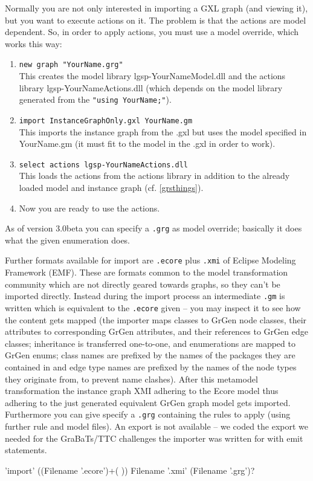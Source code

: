 \begin{note}\label{shellgxlimport}
Normally you are not only interested in importing a GXL graph (and viewing it), but you want to execute actions on it.
The problem is that the actions are model dependent.
So, in order to apply actions, you must use a model override, which works this way:
\begin{enumerate}
\item \texttt{new graph "YourName.grg"}\\
This creates the model library lgsp-YourNameModel.dll
and the actions library lgsp-YourNameActions.dll
(which depends on the model library generated from the \texttt{"using YourName;"}).
\item \texttt{import InstanceGraphOnly.gxl YourName.gm}\\
This imports the instance graph from the .gxl but uses the model specified
in YourName.gm (it must fit to the model in the .gxl in order to work).
\item \texttt{select actions lgsp-YourNameActions.dll}\\
This loads the actions from the actions library in addition to the already
loaded model and instance graph (cf. \ref{grsthings}).
\item Now you are ready to use the actions.
\end{enumerate}
As of version 3.0beta you can specify a \texttt{.grg} as model override;
basically it does what the given enumeration does.
\end{note}

\begin{note}\label{shellecoreexport}
Further formats available for import are \texttt{.ecore} plus \texttt{.xmi} of Eclipse Modeling Framework (EMF).
These are formats common to the model transformation community which are not directly geared towards graphs, so they can't be imported directly.
Instead during the import process an intermediate \texttt{.gm} is written which is equivalent to the \texttt{.ecore} given -- you may inspect it to see how the content gets mapped
(the importer maps classes to GrGen node classes, their attributes
to corresponding GrGen attributes, and their references to GrGen
edge classes; inheritance is transferred one-to-one, and enumerations are
mapped to GrGen enums;
class names are prefixed by the names of the packages they are contained in
and edge type names are prefixed by the names of the node types they originate from,
to prevent name clashes).
After this metamodel transformation the instance graph XMI adhering to the Ecore model thus adhering to the just
generated equivalent GrGen graph model gets imported.
Furthermore you can give specify a \texttt{.grg} containing the rules to apply (using further rule and model files).
An export is not available -- we coded the export we needed for the GraBaTs/TTC challenges the importer was written for with emit statements.
\begin{rail}
  'import' ((Filename '.ecore')+( )) Filename '.xmi' (Filename '.grg')?
\end{rail}
\end{note}

